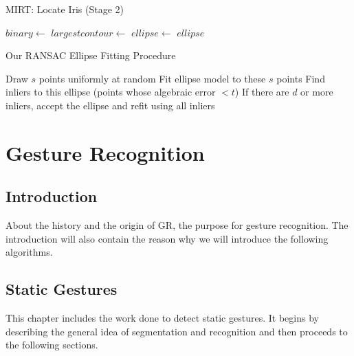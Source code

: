 \documentclass[12pt,fleqn]{book} %
\begin{document}
\begin{algorithm}[h]
\begin{dBox}
	\caption{MIRT: Locate Iris (Stage 2)} \label{mirt_iris_algo}
	\begin{algorithmic}[1]
		\State $binary \gets$ 
		\State {}
		\State {}
		\State $largestcontour \gets$ 
		\State $ellipse \gets$ 
		\State \Return $ellipse$
		\EndProcedure	
	\end{algorithmic}
\end{dBox}	
\end{algorithm}


\begin{algorithm}
\begin{dBox}
	\caption{Our RANSAC Ellipse Fitting Procedure} \label{our_ransac}
	\begin{algorithmic}[1]
			\State Draw $s$ points uniformly at random
			\State Fit ellipse model to these $s$ points
			\State Find inliers to this ellipse (points whose algebraic error $ < t$)
			\State If there are $d$ or more inliers, accept the ellipse and refit using all inliers	
		\EndWhile	
		\EndProcedure	
	\end{algorithmic}
\end{dBox}	
\end{algorithm}

\chapter{Gesture Recognition}
\section{Introduction}
About the history and the origin of GR, the purpose for gesture recognition. The 
introduction will also contain the reason why we will introduce the following algorithms.\bigskip


\section{Static Gestures}
This chapter includes the work done to detect static gestures. It begins by describing the general idea of segmentation and recognition and then proceeds to the following sections.\bigskip
\end{document}
